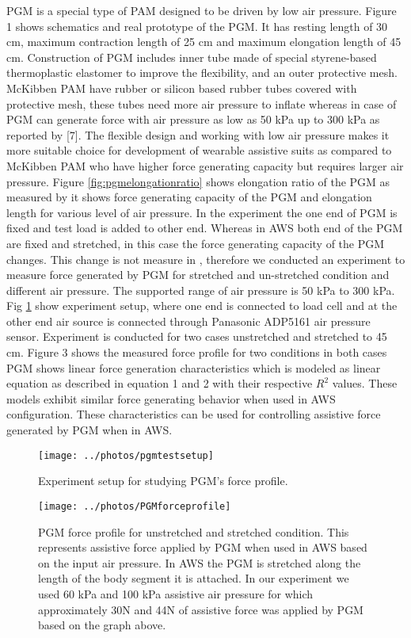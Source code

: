 \documentclass[letterpaper, 10 pt, conference]{ieeeconf}  %
\begin{document}
PGM is a special type of PAM designed to be driven by low air pressure. Figure 1 shows schematics and real prototype of the PGM. It has resting length of 30 cm, maximum contraction length of 25 cm and maximum elongation length of 45 cm. Construction of PGM includes inner tube made of special styrene-based thermoplastic elastomer to improve the flexibility, and an outer protective mesh. McKibben PAM have rubber or silicon based rubber tubes covered with protective mesh, these tubes need more air pressure to inflate whereas in case of PGM can generate force with air pressure as low as 50 kPa up to 300 kPa as reported by [7]. The flexible design and working with low air pressure makes it more suitable choice for development of wearable assistive suits as compared to McKibben PAM who have higher force generating capacity but requires larger air pressure. Figure \ref{fig:pgmelongationratio} shows elongation ratio of the PGM as measured by \cite{7} it shows force generating capacity of the PGM and elongation length for various level of air pressure. In the experiment the one end of PGM is fixed and test load is added to other end. Whereas in AWS both end of the PGM are fixed and stretched, in this case the force generating capacity of the PGM changes. This change is not measure in \cite{7}, therefore we conducted an experiment to measure force generated by PGM for stretched and un-stretched condition and different air pressure. The supported range of air pressure is 50 kPa to 300 kPa. Fig \ref{fig:pgmtest} show experiment setup, where one end is connected to load cell and at the other end air source is connected through Panasonic ADP5161 air pressure sensor. Experiment is conducted for two cases unstretched and stretched to 45 cm. Figure 3 shows the measured force profile for two conditions in both cases PGM shows linear force generation characteristics which is modeled as linear equation as described in equation 1 and 2 with their respective $R^2$ values. These models exhibit similar force generating behavior when used in AWS configuration. These characteristics can be used for controlling assistive force generated by PGM when in AWS.

\begin{figure}
	\centering
	\texttt{[image: ../photos/pgmtestsetup]}
	\caption{Experiment setup for studying PGM's force profile.}
	\label{fig:pgmtest}
\end{figure}

\begin{figure}
	\centering
	\texttt{[image: ../photos/PGMforceprofile]}
	\caption{PGM force profile for unstretched and stretched condition. This represents assistive force applied by PGM when used in AWS based on the input air pressure. In AWS the PGM is stretched along the length of the body segment it is attached. In our experiment we used 60 kPa and 100 kPa assistive air pressure for which approximately 30N and 44N of assistive force was applied by PGM based on the graph above.}
	\label{fig:pgmforceprofile}
\end{figure}
\end{document}
